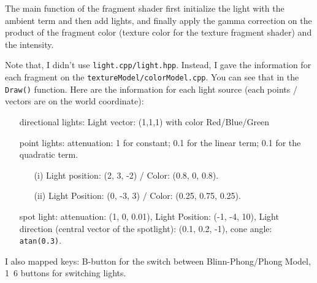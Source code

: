 \documentclass[11pt]{article}
\begin{document}
The main function of the fragment shader first initialize the light with the ambient term and then add lights, and finally apply the gamma correction on the product of the fragment color (texture color for the texture fragment shader) and the intensity.

Note that, I didn't use \texttt{light.cpp/light.hpp}. Instead, I gave the information for each fragment on the \texttt{textureModel/colorModel.cpp}. You can see that in the \texttt{Draw()} function. Here are the information for each light source (each points / vectors are on the world coordinate):
\begin{itemize}
	\item[directional lights:] Light vector: (1,1,1) with color Red/Blue/Green
	\item[point lights:] attenuation: 1 for constant; 0.1 for the linear term; 0.1 for the quadratic term.
	\begin{itemize}
		\item [(i)] Light position: (2, 3, -2) / Color: (0.8, 0, 0.8).
		\item [(ii)] Light Position: (0, -3, 3) / Color: (0.25, 0.75, 0.25).
	\end{itemize}
	\item[spot light:] attenuation: (1, 0, 0.01), Light Position: (-1, -4, 10), Light direction (central vector of the spotlight): (0.1, 0.2, -1), cone angle: \texttt{atan(0.3)}.
\end{itemize}

I also mapped keys: B-button for the switch between Blinn-Phong/Phong Model, 1~6 buttons for switching lights.
\end{document}
